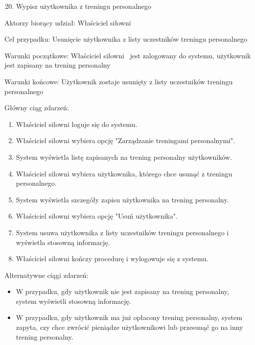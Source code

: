\documentclass[
]{article}
\providecommand{\tightlist}{%
  \setlength{\itemsep}{0pt}\setlength{\parskip}{0pt}}
\begin{document}
\begin{enumerate}
\setcounter{enumi}{19}
\tightlist
\item
  {Wypisz użytkownika z treningu personalnego}
\end{enumerate}

{Aktorzy biorący udział: Właściciel siłowni}

{Cel przypadku: Usunięcie użytkownika z listy uczestników treningu
personalnego}

{Warunki początkowe: Właściciel siłowni ~jest zalogowany do systemu,
użytkownik jest zapisany na trening personalny}

{Warunki końcowe: Użytkownik zostaje usunięty z listy uczestników
treningu personalnego}

{Główny ciąg zdarzeń:}

\begin{enumerate}
\tightlist
\item
  {Właściciel siłowni loguje się do systemu.}
\item
  {Właściciel siłowni wybiera opcję "Zarządzanie treningami
  personalnymi".}
\item
  {System wyświetla listę zapisanych na trening personalny
  użytkowników.}
\item
  {Właściciel siłowni wybiera użytkownika, którego chce usunąć z
  treningu personalnego.}
\item
  {System wyświetla szczegóły zapisu użytkownika na trening personalny.}
\item
  {Właściciel siłowni wybiera opcję "Usuń użytkownika".}
\item
  {System usuwa użytkownika z listy uczestników treningu personalnego i
  wyświetla stosowną informację.}
\item
  {Właściciel siłowni kończy procedurę i wylogowuje się z systemu.}
\end{enumerate}

{Alternatywne ciągi zdarzeń:}

\begin{itemize}
\tightlist
\item
  {W przypadku, gdy użytkownik nie jest zapisany na trening personalny,
  system wyświetli stosowną informację.}
\item
  {W przypadku, gdy użytkownik ma już opłacony trening personalny,
  system zapyta, czy chce zwrócić pieniądze użytkownikowi lub przesunąć
  go na inny trening personalny.}
\end{itemize}

{}
\end{document}

